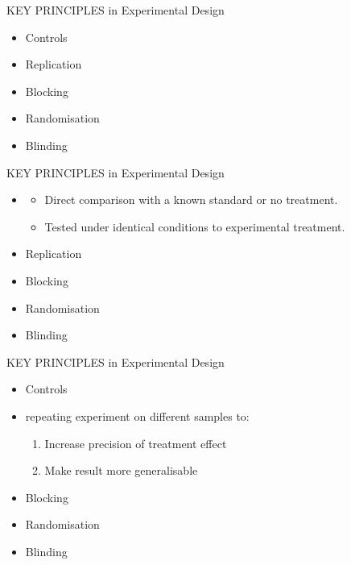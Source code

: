 \documentclass[10pt]{beamer}
\begin{document}
\begin{frame}{KEY PRINCIPLES in Experimental Design}

\begin{alertblock}{}
 \begin{itemize}
  \item Controls
  \item Replication
  \item Blocking
  \item Randomisation
  \item Blinding
 \end{itemize}

\end{alertblock}

\end{frame}


\begin{frame}{KEY PRINCIPLES in Experimental Design}

\begin{alertblock}{}
 \begin{itemize}
  \item {\color{red}{Controls}}
    \begin{itemize}
     \item Direct comparison with a known standard or no treatment.
      \item Tested under identical conditions to experimental treatment.
    \end{itemize}
  \item Replication
  \item Blocking
  \item Randomisation
  \item Blinding
 \end{itemize}

\end{alertblock}

\end{frame}


\begin{frame}{KEY PRINCIPLES in Experimental Design}

\begin{alertblock}{}
 \begin{itemize}
  \item Controls
  \item {\color{red}{Replication}} repeating experiment on different samples to: 
    \begin{enumerate}
      \item Increase precision of treatment effect
      \item Make result more generalisable
    \end{enumerate}
  \item Blocking
  \item Randomisation
  \item Blinding
 \end{itemize}

\end{alertblock}

\end{frame}
\end{document}
